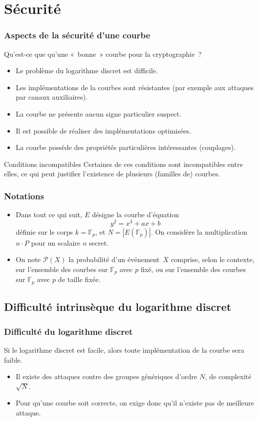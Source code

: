 \documentclass[francais]{beamer}
\newcommand{\abs}[1]{\left| #1 \right|}
\newcommand{\F}{\mathbb{F}}
\newcommand{\prob}{\mathcal{P}}
\begin{document}
\section{Sécurité}

\begin{frame}\frametitle{Aspects de la sécurité d'une courbe}
Qu'est-ce que qu'une « bonne » courbe pour la cryptographie ?
\begin{itemize}
\item Le problème du logarithme discret est difficile.
\item Les implémentations de la courbes sont résistantes
(par exemple aux attaques par canaux auxiliaires).
\item La courbe ne présente aucun signe particulier suspect.
\item Il est possible de réaliser des implémentations optimisées.
\item La courbe possède des propriétés particulières intéressantes (couplages).
\end{itemize}
\begin{block}{Conditions incompatibles}
Certaines de ces conditions sont incompatibles entre elles,
ce qui peut justifier l'existence de plusieurs (familles de) courbes.
\end{block}
\end{frame}

\begin{frame}\frametitle{Notations}
\begin{itemize}
\item Dans tout ce qui suit, $E$ désigne la courbe d'équation
\[ y^2 = x^3 + a x + b\]
définie sur le corps $k = \F_p$, et $N = \abs{E(\F_p)}$.
On considère la multiplication $n · P$ pour un scalaire $n$ secret.
\bigskip
\item On note $\prob(X)$ la probabilité d'un événement~$X$
comprise, selon le contexte,
sur l'ensemble des courbes sur $\F_p$ avec $p$ fixé,
ou sur l'ensemble des courbes sur $\F_p$ avec $p$ de taille fixée.
\end{itemize}
\end{frame}

\subsection{Difficulté intrinsèque du logarithme discret}


\begin{frame}\frametitle{Difficulté du logarithme discret}
\begin{block}{}
Si le logarithme discret est facile, alors
toute implémentation de la courbe sera faible.
\end{block}
\begin{itemize}
\item Il existe des attaques contre des groupes génériques d'ordre $N$,
de complexité $\sqrt{N}$.
\item Pour qu'une courbe soit correcte,
on exige donc qu'il n'existe pas de meilleure attaque.
\end{itemize}
\end{frame}
\end{document}
